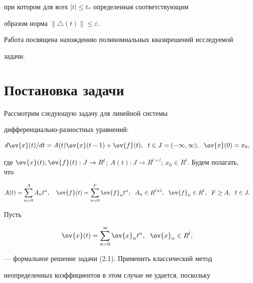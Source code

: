 при котором для всех $|t|\leq t_{*}$ определенная соответствующим


образом норма $\| \triangle (t) \| \leq \varepsilon $.





Работа посвящена нахождению полиномиальных квазирешений исследуемой


задачи.





\section {Постановка задачи}





Рассмотрим следующую задачу для линейной системы


дифференциально-раз\-ностных уравнений:


\begin{equation}


d\ov{x}(t)/dt=A(t)\ov{x}(t-1)+\ov{f}(t),\ \; t\in J=(-\infty,\infty),\ \;


\ov{x}(0)=x_{0},


\end{equation}


где $\ov{x}(t),\ov{f}(t):J\to R^{l}$; $A(t):J\to


R^{l\times l}$; $x_{0}\in R^{l}$. Будем полагать, что


\begin{equation}


A(t)=\sum_{n=0}^{A}A_{n}t^{n},\quad


\ov{f}(t)=\sum_{n=0}^{F}\ov{f}_{n}t^{n};\ \; A_{n}\in R^{l\times l},\ \;


\ov{f}_{n}\in R^{l},\ \; F\geq A,\ \;t\in J.


\end{equation}


Пусть


\begin{equation}


\ov{x}(t)=\sum_{n=0}^{\infty}\ov{x}_{n}t^{n},\ \;\ov{x}_{n}\in R^{l},


\end{equation}


--- формальное решение задачи (2.1). Применить классический метод


неопределенных коэффициентов в этом случае не удается, поскольку


